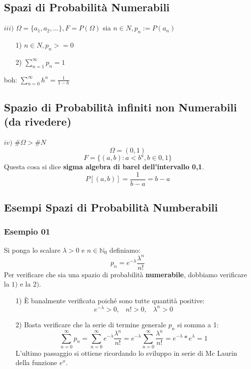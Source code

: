\subsection{Spazi di Probabilità Numerabili}
$iii)$ $\Omega = \{a_1, a_2,...\}, F = P(\Omega)$
sia $n \in N, p_n:= P({a_n})$
\begin{itemize}
\item[1)] $n \in N, p_n >= 0$
\item[2)] $ \sum_{n=1}^{\infty} p_n = 1$
\end{itemize}
boh: $ \sum_{n=0}^{\infty} h^n = \frac{1}{1-h}$

\subsection{Spazio di Probabilità infiniti non Numerabili (da rivedere)}
$iv)$ $\#\Omega > \#N$ \\
$$ \Omega = (0,1)$$
$$ F = \{ (a,b): a<b ^ a,b \in 0,1 \} $$
Questa cosa si dice \textbf{sigma algebra di barel dell'intervallo 0,1}.\\
$$ P[(a,b)] = \frac{1}{b-a} = b-a $$

\subsection{Esempi Spazi di Probabilità Numberabili}
\subsubsection{Esempio 01}
Si ponga lo scalare $\lambda > 0 $  e $ n \in \mathbb{N}_0 $ definiamo: 
$$ \textit{p}_n = e^{-\lambda} \frac{\lambda^n}{n!} $$
Per verificare che sia una spazio di probabilità \textbf{numerabile}, dobbiamo verificare la $1)$ e la $2)$.
\begin{itemize}
\item[1)] È banalmente verificata poiché sono tutte quantità positive:
$$  e^{- \lambda} > 0, \;\;\; n! > 0, \;\;\; \lambda^n > 0 $$
\item[2)] Basta verificare che la serie di termine generale $\textit{p}_n$ si somma a 1:
$$ \sum_{n=0}^{\infty} \textit{p}_n = \sum_{n=0}^{\infty} e^{-\lambda} \frac{\lambda^n}{n!} = e^{-\lambda} \sum_{n=0}^{\infty} \frac{\lambda^n}{n!} = e^{-\lambda} * e^{\lambda} = 1 $$
L'ultimo passaggio si ottiene ricordando lo sviluppo in serie di Mc Laurin della funzione $e^x$.
\end{itemize}

